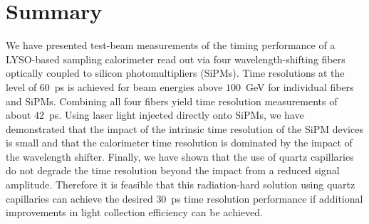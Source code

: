 \section{Summary}

We have presented test-beam measurements of the timing performance of a
LYSO-based sampling calorimeter read out via four wavelength-shifting fibers
optically coupled to silicon photomultipliers (SiPMs). Time resolutions at the
level of $60$~ps is achieved for beam energies above $100$~GeV for individual
fibers and SiPMs. Combining all four fibers yield time resolution measurements
of about $42$~ps. Using laser light injected directly onto SiPMs, we have
demonstrated that the impact of the intrinsic time resolution of the SiPM
devices is small and that the calorimeter time resolution is dominated by the
impact of the wavelength shifter. Finally, we have shown that the use of quartz
capillaries do not degrade the time resolution beyond the impact from a reduced
signal amplitude. Therefore it is feasible that this radiation-hard solution
using quartz capillaries can achieve the desired $30$~ps time resolution
performance if additional improvements in light collection efficiency can be
achieved.
